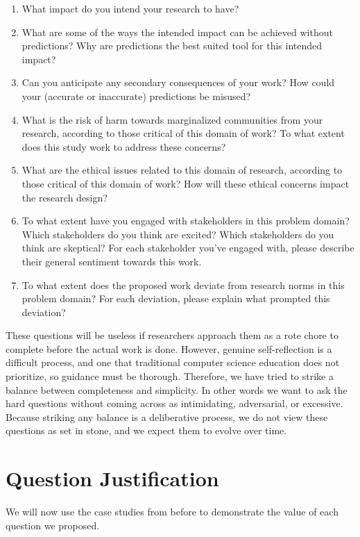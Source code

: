 \documentclass[12pt]{article}
\begin{document}
    \begin{enumerate}
    	\item What impact do you intend your research to have? 
    	\item What are some of the ways the intended impact can be achieved without predictions? Why are predictions the best suited tool for this intended impact? 
    	\item Can you anticipate any secondary consequences of your work? How could your (accurate or inaccurate) predictions be misused?
    	\item What is the risk of harm towards marginalized communities from your research, according to those critical of this domain of work? To what extent does this study work to address these concerns?
    	\item What are the ethical issues related to this domain of research, according to those critical of this domain of work? How will these ethical concerns impact the research design?
    	\item To what extent have you engaged with stakeholders in this problem domain? Which stakeholders do you think are excited? Which stakeholders do you think are skeptical? For each stakeholder you've engaged with, please describe their general sentiment towards this work. 
    	\item To what extent does the proposed work deviate from research norms in this problem domain? For each deviation, please explain what prompted this deviation?
	\end{enumerate}
	
	These questions will be useless if researchers approach them as a rote chore to complete before the actual work is done. However, genuine self-reflection is a difficult process, and one that traditional computer science education does not prioritize, so guidance must be thorough. Therefore, we have tried to strike a balance between completeness and simplicity. In other words we want to ask the hard questions without coming across as intimidating, adversarial, or excessive. Because striking any balance is a deliberative process, we do not view these questions as set in stone, and we expect them to evolve over time. 
	
\section{Question Justification}

	We will now use the case studies from before to demonstrate the value of each question we proposed. 
\end{document}
